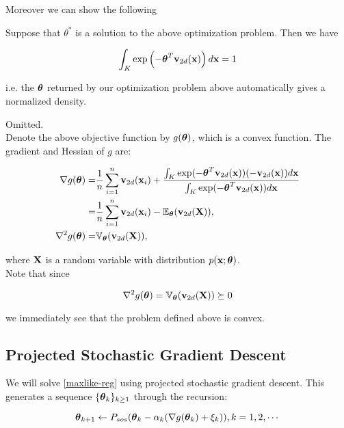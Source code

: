 \documentclass[11pt,reqno]{amsart}
\numberwithin{equation}{section}
\newcommand{\lft}{\left(}
\newcommand{\rt}{\right)}
\begin{document}
Moreover we can show the following

\begin{lemma}[Normalization] Suppose that $\theta^*$ is a solution to the above optimization problem. Then we have 

\[
\int_{K} \exp \lft -\bftheta^T \bfv_{2d}(\bfx) \rt d \bfx =1 
\]

i.e. the ${\boldsymbol\theta}$ returned by our optimization problem above automatically gives a normalized density. 

\end{lemma}

\proof Omitted. \\


Denote the above objective function by $g({\boldsymbol\theta})$, which is a convex function. The gradient and Hessian of $g$ are:

\begin{align}
\nabla g({\boldsymbol\theta}) =& \frac{1}{n} \sum_{i = 1}^n {\bf v}_{2d}({\bf x}_i) + \frac{\int_ K\exp (-{\boldsymbol\theta}^T{\bf v}_{2d}({\bf x})) (-{\bf v}_{2d}({\bf x}) )d{\bf x} }{\int_K \exp (-{\boldsymbol\theta}^T{\bf v}_{2d}({\bf x})) d{\bf x}}\notag\\
=& \frac{1}{n} \sum_{i = 1}^n {\bf v}_{2d}({\bf x}_i) - \mathbb E_{\boldsymbol\theta} ({\bf v}_{2d}({\bf X})),\label{neg-loglike-gradient}\\
\nabla^2 g({\boldsymbol\theta}) =& \mathbb V_{\boldsymbol\theta} ({\bf v}_{2d}({\bf X})), \label{neg-loglike-hessian}
\end{align}

where ${\bf X}$ is a random variable with distribution $p({\bf x}; {\boldsymbol\theta})$. \\

Note that since 

\begin{equation} \label{obj-convex}
\nabla^2 g({\boldsymbol\theta}) = \mathbb V_{\boldsymbol\theta} ({\bf v}_{2d}({\bf X})) \succeq 0
\end{equation}

we immediately see that the problem defined above is convex. 

\subsection{Projected Stochastic Gradient Descent}

We will solve \eqref{maxlike-reg} using projected stochastic gradient descent. This generates a sequence $\{{\boldsymbol\theta}_k\}_{k \ge 1}$ through the recursion:

\begin{equation} \label{gpa-recursion}
{\boldsymbol\theta}_{k + 1} \leftarrow P_{sos} ({\boldsymbol\theta}_k - \alpha_k (\nabla g({\boldsymbol\theta}_k) + \xi_k) ), k = 1, 2, \cdots
\end{equation}
\end{document}
